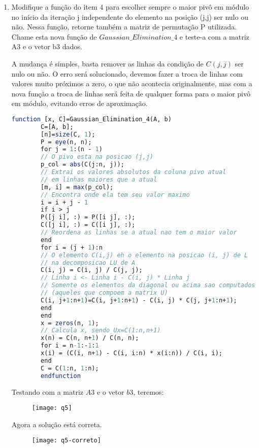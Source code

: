 \documentclass[leqno]{article}
\numberwithin{equation}{section}
\begin{document}
\begin{enumerate}

\item Modifique a função do item 4 para escolher sempre o maior pivô em módulo
no início da iteração j independente do elemento na posição (j,j) ser nulo ou
não. Nessa função, retorne também a matriz de permutação P utilizada.
Chame esta nova função de $Gaussian\_Elimination\_4$ e teste-a com a matriz
A3 e o vetor b3 dados.

\begin{sol}
	A mudança é simples, basta remover as linhas da condição de $C(j,j)$ ser nulo ou
	não. O erro será solucionado, devemos fazer a troca de linhas com valores muito próximos a zero, o que não acontecia originalmente, mas com a nova função a  troca de linhas será feita de qualquer forma para o maior pivô em módulo, evitando erros de aproximação.
	
	\begin{lstlisting}[language=Scilab]
		function [x, C]=Gaussian_Elimination_4(A, b) 
		C=[A, b];
		[n]=size(C, 1);
		P = eye(n, n);
		for j = 1:(n - 1)
		// O pivo esta na posicao (j,j)
		p_col = abs(C(j:n, j));
		// Extrai os valores absolutos da coluna pivo atual
		// em linhas maiores que a atual
		[m, i] = max(p_col);
		// Encontra onde ela tem seu valor maximo
		i = i + j - 1
		if i > j
		P([j i], :) = P([i j], :);
		C([j i], :) = C([i j], :);
		// Reordena as linhas se a atual nao tem o maior valor
		end
		for i = (j + 1):n
		// O elemento C(i,j) eh o elemento na posicao (i, j) de L
		// na decomposicao LU de A
		C(i, j) = C(i, j) / C(j, j);
		// Linha i <- Linha i - C(i, j) * Linha j
		// Somente os elementos da diagonal ou acima sao computados
		// (aqueles que compoem a matrix U)
		C(i, j+1:n+1)=C(i, j+1:n+1) - C(i, j) * C(j, j+1:n+1);
		end
		end
		x = zeros(n, 1);
		// Calcula x, sendo Ux=C(1:n,n+1)
		x(n) = C(n, n+1) / C(n, n);
		for i = n-1:-1:1
		x(i) = (C(i, n+1) - C(i, i:n) * x(i:n)) / C(i, i);
		end
		C = C(1:n, 1:n);
		endfunction
	\end{lstlisting}

	Testando com a matriz $A3$ e o vetor $b3$, teremos:
	\begin{figure}[H]
		\centering
		\texttt{[image: q5]}
	\end{figure}
	
	Agora a solução está correta.
	\begin{figure}[H]
		\centering
		\texttt{[image: q5-correto]}
	\end{figure}


\end{sol}
\end{enumerate}
\end{document}
